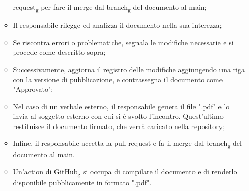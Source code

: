 \begin{itemize}
\begin{itemize}
                        request\textsubscript{g} per fare il merge dal branch\textsubscript{g} del
                        documento al main;
                  \item Il responsabile rilegge ed analizza il documento nella sua interezza;
                  \item Se riscontra errori o problematiche, segnala le modifiche necessarie e si
                        procede come descritto sopra;
                  \item Successivamente, aggiorna il registro delle modifiche aggiungendo una riga con
                        la versione di pubblicazione, e contrassegna il documento come "Approvato";
                  \item Nel caso di un verbale esterno, il responsabile genera il file ".pdf" e lo
                        invia al soggetto esterno con cui si è svolto l'incontro. Quest'ultimo
                        restituisce il documento firmato, che verrà caricato nella repository;
                  \item Infine, il responsabile accetta la pull request e fa il merge dal
                        branch\textsubscript{g} del documento al main.
                  \item Un'action di GitHub\textsubscript{g} si occupa di compilare il documento e di
                        renderlo disponibile pubblicamente in formato ".pdf".
            \end{itemize}
\end{itemize}

\newpage

